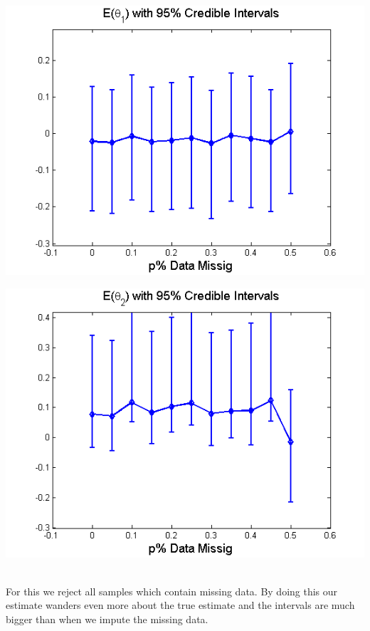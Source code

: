 \documentclass{article}
\begin{document}
\begin{itemize}
\begin{left}
\includegraphics[scale=0.5]{Theta1_Conf.png}
\end{left}
\begin{right}
\includegraphics[scale=0.5]{Theta2_Conf.png}\\
\end{right}

\pagebreak
{} \\

For this we reject all samples which contain missing data. By doing this our estimate wanders even more about the true estimate and the intervals are much bigger than when we impute the missing data.\\


\end{itemize}
\end{document}
